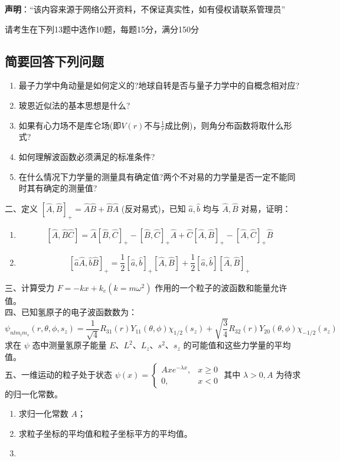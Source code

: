 
\textbf{声明}：“该内容来源于网络公开资料，不保证真实性，如有侵权请联系管理员”

请考生在下列13题中选作10题，每题15分，满分150分
\subsection{简要回答下列问题}
\begin{enumerate}
\item 最子力学中角动量是如何定义的?地球自转是否与量子力学中的自概念相对应?
\item 玻恩近似法的基本思想是什么?
\item 如果有心力场不是库仑场(即$V(r)$不与$\frac{1}{r}$成比例)，则角分布函数将取什么形式?
\item 如何理解波函数必须满足的标准条件?
\item 在什么情况下力学量的测量具有确定值?两个不对易的力学量是否一定不能同时其有确定的测量值?
\end{enumerate}
二、定义 $[\hat{A}, \hat{B}]_{+} = \hat{A}\hat{B} + \hat{B}\hat{A}$ (反对易式)，已知 $\hat{a}, \hat{b}$ 均与 $\hat{A}, \hat{B}$ 对易，证明：

\begin{enumerate}
    \item 
    \[
    [\hat{A}, \hat{B}\hat{C}] = \hat{A}[\hat{B}, \hat{C}]_{+} - [\hat{B}, \hat{C}]_{+}\hat{A} + \hat{C}[\hat{A}, \hat{B}]_{+} - [\hat{A}, \hat{C}]_{+}\hat{B}~
    \]
    \item 
    \[
    [\hat{a}\hat{A}, \hat{b}\hat{B}]_{+} = \frac{1}{2}[\hat{a}, \hat{b}]_{+}[\hat{A}, \hat{B}] + \frac{1}{2}[\hat{a}, \hat{b}][\hat{A}, \hat{B}]_{+}~
    \]
\end{enumerate}
三、计算受力 $F = -kx + k_e (k = m\omega^2)$ 作用的一个粒子的波函数和能量允许值。\\
四、已知氢原子的电子波函数数为：
\[
\psi_{n l m_l m_s}(r,\theta,\phi,s_z) = \frac{1}{\sqrt{4}} R_{31}(r) Y_{11}(\theta, \phi)\chi_{1/2}(s_z) + \sqrt{\frac{3}{4}} R_{32}(r) Y_{20}(\theta, \phi)\chi_{-1/2}(s_z)~
\]
求在 $\psi$ 态中测量氢原子能量 $E$、$L^2$、$L_z$、$s^2$、$s_z$ 的可能值和这些力学量的平均值。\\
五、一维运动的粒子处于状态 $\psi(x) = 
\begin{cases} 
    Axe^{-\lambda x}, & x \geq 0 \\
    0, & x < 0 
\end{cases}
$ 其中 $\lambda > 0, A$ 为待求的归一化常数。

\begin{enumerate}
    \item 求归一化常数 $A$；
    \item 求粒子坐标的平均值和粒子坐标平方的平均值。
    \item 
\end{enumerate}
